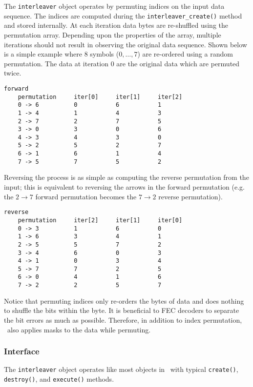 The {\tt interleaver} object operates by permuting indices on the input data
sequence.
The indices are computed during the {\tt interleaver\_create()} method and
stored internally.
At each iteration data bytes are re-shuffled using the permutation array.
Depending upon the properties of the array, multiple iterations should not
result in observing the original data sequence.
Shown below is a simple example where 8 symbols ($0,\ldots,7$) are re-ordered
using a random permutation.
The data at iteration 0 are the original data which are permuted twice.
\begin{Verbatim}[fontsize=\small]
    forward
    permutation     iter[0]     iter[1]     iter[2]
    0 -> 6          0           6           1
    1 -> 4          1           4           3
    2 -> 7          2           7           5
    3 -> 0          3           0           6
    4 -> 3          4           3           0
    5 -> 2          5           2           7
    6 -> 1          6           1           4
    7 -> 5          7           5           2
\end{Verbatim}
%
Reversing the process is as simple as computing the reverse permutation from
the input; this is equivalent to reversing the arrows in the forward
permutation
(e.g. the $2 \rightarrow 7$ forward permutation becomes the $7 \rightarrow 2$
reverse permutation).
\begin{Verbatim}[fontsize=\small]
    reverse
    permutation     iter[2]     iter[1]     iter[0]
    0 -> 3          1           6           0
    1 -> 6          3           4           1
    2 -> 5          5           7           2
    3 -> 4          6           0           3
    4 -> 1          0           3           4
    5 -> 7          7           2           5
    6 -> 0          4           1           6
    7 -> 2          2           5           7
\end{Verbatim}
%
Notice that permuting indices only re-orders the bytes of data and does
nothing to shuffle the bits within the byte.
It is beneficial to FEC decoders to separate the bit errors as much as
possible.
Therefore, in addition to index permutation, \liquid\ also applies masks to
the data while permuting.

\subsubsection{Interface}
\label{module:fec:interleaver:interface}
The {\tt interleaver} object operates like most objects in \liquid\ with
typical {\tt create()}, {\tt destroy()}, and {\tt execute()} methods.

